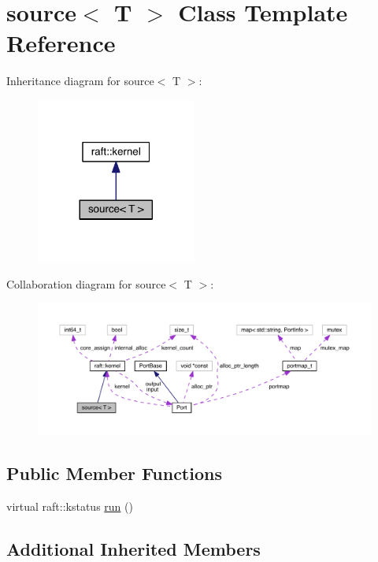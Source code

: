 \hypertarget{classsource}{}\section{source$<$ T $>$ Class Template Reference}
\label{classsource}


Inheritance diagram for source$<$ T $>$\+:
\nopagebreak
\begin{figure}[H]
\begin{center}
\leavevmode
\includegraphics[width=149pt]{classsource__inherit__graph}
\end{center}
\end{figure}


Collaboration diagram for source$<$ T $>$\+:
\nopagebreak
\begin{figure}[H]
\begin{center}
\leavevmode
\includegraphics[width=350pt]{classsource__coll__graph}
\end{center}
\end{figure}
\subsection*{Public Member Functions}
\begin{DoxyCompactItemize}
\item 
virtual raft\+::kstatus \hyperlink{classsource_ad144988607882cbe591a4c71642cb77a}{run} ()
\end{DoxyCompactItemize}
\subsection*{Additional Inherited Members}


